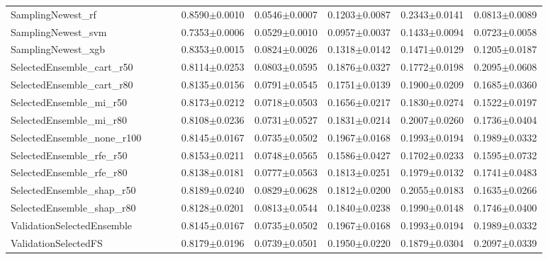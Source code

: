 \begin{longtable}{p{0.28\linewidth}p{0.12\linewidth}p{0.12\linewidth}p{0.12\linewidth}p{0.12\linewidth}p{0.12\linewidth}}
SamplingNewest\_\allowbreak{}rf & 0.8590\(\pm\)0.0010 & 0.0546\(\pm\)0.0007 & 0.1203\(\pm\)0.0087 & 0.2343\(\pm\)0.0141 & 0.0813\(\pm\)0.0089 \\
SamplingNewest\_\allowbreak{}svm & 0.7353\(\pm\)0.0006 & 0.0529\(\pm\)0.0010 & 0.0957\(\pm\)0.0037 & 0.1433\(\pm\)0.0094 & 0.0723\(\pm\)0.0058 \\
SamplingNewest\_\allowbreak{}xgb & 0.8353\(\pm\)0.0015 & 0.0824\(\pm\)0.0026 & 0.1318\(\pm\)0.0142 & 0.1471\(\pm\)0.0129 & 0.1205\(\pm\)0.0187 \\
SelectedEnsemble\_\allowbreak{}cart\_\allowbreak{}r50 & 0.8114\(\pm\)0.0253 & 0.0803\(\pm\)0.0595 & 0.1876\(\pm\)0.0327 & 0.1772\(\pm\)0.0198 & 0.2095\(\pm\)0.0608 \\
SelectedEnsemble\_\allowbreak{}cart\_\allowbreak{}r80 & 0.8135\(\pm\)0.0156 & 0.0791\(\pm\)0.0545 & 0.1751\(\pm\)0.0139 & 0.1900\(\pm\)0.0209 & 0.1685\(\pm\)0.0360 \\
SelectedEnsemble\_\allowbreak{}mi\_\allowbreak{}r50 & 0.8173\(\pm\)0.0212 & 0.0718\(\pm\)0.0503 & 0.1656\(\pm\)0.0217 & 0.1830\(\pm\)0.0274 & 0.1522\(\pm\)0.0197 \\
SelectedEnsemble\_\allowbreak{}mi\_\allowbreak{}r80 & 0.8108\(\pm\)0.0236 & 0.0731\(\pm\)0.0527 & 0.1831\(\pm\)0.0214 & 0.2007\(\pm\)0.0260 & 0.1736\(\pm\)0.0404 \\
SelectedEnsemble\_\allowbreak{}none\_\allowbreak{}r100 & 0.8145\(\pm\)0.0167 & 0.0735\(\pm\)0.0502 & 0.1967\(\pm\)0.0168 & 0.1993\(\pm\)0.0194 & 0.1989\(\pm\)0.0332 \\
SelectedEnsemble\_\allowbreak{}rfe\_\allowbreak{}r50 & 0.8153\(\pm\)0.0211 & 0.0748\(\pm\)0.0565 & 0.1586\(\pm\)0.0427 & 0.1702\(\pm\)0.0233 & 0.1595\(\pm\)0.0732 \\
SelectedEnsemble\_\allowbreak{}rfe\_\allowbreak{}r80 & 0.8138\(\pm\)0.0181 & 0.0777\(\pm\)0.0563 & 0.1813\(\pm\)0.0251 & 0.1979\(\pm\)0.0132 & 0.1741\(\pm\)0.0483 \\
SelectedEnsemble\_\allowbreak{}shap\_\allowbreak{}r50 & 0.8189\(\pm\)0.0240 & 0.0829\(\pm\)0.0628 & 0.1812\(\pm\)0.0200 & 0.2055\(\pm\)0.0183 & 0.1635\(\pm\)0.0266 \\
SelectedEnsemble\_\allowbreak{}shap\_\allowbreak{}r80 & 0.8128\(\pm\)0.0201 & 0.0813\(\pm\)0.0544 & 0.1840\(\pm\)0.0238 & 0.1990\(\pm\)0.0148 & 0.1746\(\pm\)0.0400 \\
ValidationSelectedEnsemble & 0.8145\(\pm\)0.0167 & 0.0735\(\pm\)0.0502 & 0.1967\(\pm\)0.0168 & 0.1993\(\pm\)0.0194 & 0.1989\(\pm\)0.0332 \\
ValidationSelectedFS & 0.8179\(\pm\)0.0196 & 0.0739\(\pm\)0.0501 & 0.1950\(\pm\)0.0220 & 0.1879\(\pm\)0.0304 & 0.2097\(\pm\)0.0339 \\
\end{longtable}
\endgroup
